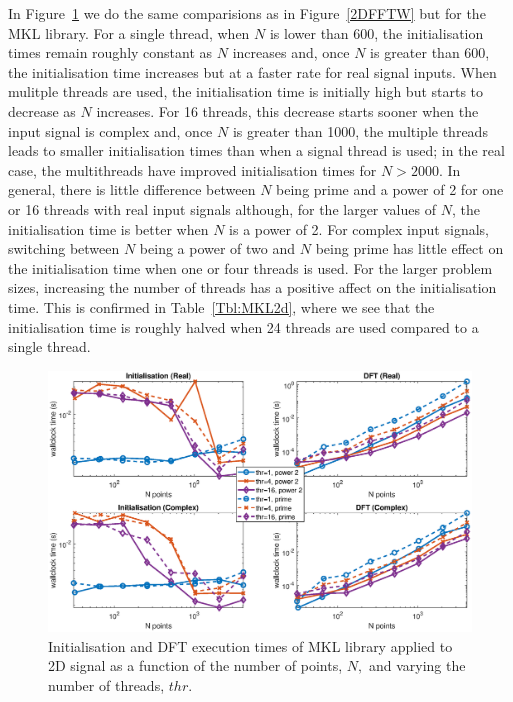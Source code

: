 \documentclass[a4paper]{article}
\begin{document}
In Figure~\ref{2DMKL} we do the same comparisions as in
Figure~\ref{2DFFTW} but for the MKL library. For a single thread, when
$N$ is lower than 600, the initialisation times remain roughly
constant as $N$ increases and, once $N$ is greater than 600, the
initialisation time increases but at a faster rate for real signal
inputs. When mulitple threads are used, the initialisation time is
initially high but starts to decrease as $N$ increases. For 16
threads, this decrease starts sooner when the input signal is complex
and, once $N$ is greater than 1000, the multiple threads leads to
smaller initialisation times than when a signal thread is used; in the
real case, the multithreads have improved initialisation times for
$N>2000.$ In general, there is little difference between $N$ being
prime and a power of 2 for one or 16 threads with real input signals
although, for the larger values of $N$, the initialisation time is
better when $N$ is a power of 2. For complex input signals, switching
between $N$ being a power of two and $N$ being prime has little effect
on the initialisation time when one or four threads is used. For the
larger problem sizes, increasing the number of threads has a positive
affect on the initialisation time.  This is confirmed in
Table~\ref{Tbl:MKL2d}, where we see that the initialisation time is
roughly halved when 24 threads are used compared to a single thread.



\begin{figure}[htb]
    \centering
    \includegraphics[width=\linewidth]{../results/mkl_2d_thr.eps}
  \caption{Initialisation and DFT execution times of MKL library applied to 2D signal as a function of the
    number of points, $N,$ and varying the number of threads, $thr.$ }
  \label{2DMKL}
\end{figure}
\end{document}
